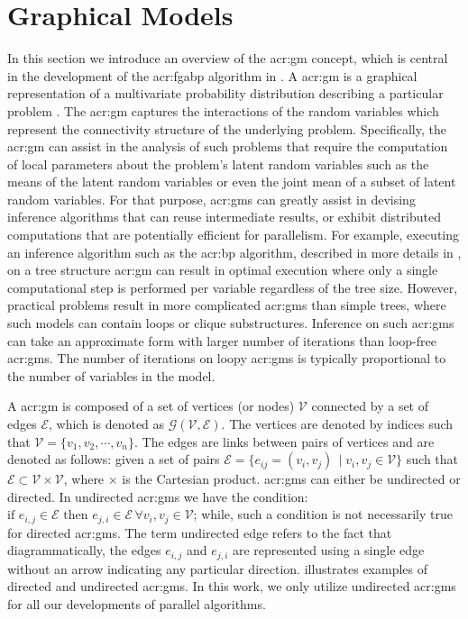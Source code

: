 \section{Graphical Models}


In this section we introduce an overview of the \gls{acr:gm} concept, which is central in the development of the \gls{acr:fgabp} algorithm in .
A \gls{acr:gm} is a graphical representation of a multivariate probability distribution describing a particular problem \cite{bib:PGMkoller2009}.
The \gls{acr:gm} captures the interactions of the random variables which represent the connectivity structure of the underlying problem.
Specifically, the \gls{acr:gm} can assist in the analysis of such problems that require the computation of local parameters about the problem's latent random variables such as the means of the latent random variables or even the joint mean of a subset of latent random variables.
For that purpose, \glspl{acr:gm} can greatly assist in devising inference algorithms that can reuse intermediate results, or exhibit distributed computations that are potentially efficient for parallelism.
For example, executing an inference algorithm such as the \gls{acr:bp} algorithm, described in more details in , on a tree structure \gls{acr:gm} can result in optimal execution where only a single computational step is performed per variable regardless of the tree size.
However, practical problems result in more complicated \glspl{acr:gm} than simple trees, where such models can contain loops or clique substructures.
Inference on such \glspl{acr:gm} can take an approximate form with larger number of iterations than loop-free \glspl{acr:gm}.
The number of iterations on loopy \glspl{acr:gm} is typically proportional to the number of variables in the model.  


A \gls{acr:gm} is composed of a set of vertices (or nodes) $\mathcal{V}$ connected by a set of edges $\mathcal{E}$, which is denoted as $\mathcal{G}(\mathcal{V},\mathcal{E})$.
The vertices are denoted by indices such that $\mathcal{V}=\{v_1,v_2,\cdots,v_n\}$.
The edges are links between pairs of vertices and are denoted as follows: given a set of pairs $\mathcal{E} = \{e_{ij} = (v_i,v_j)\, \mid v_i,v_j \in \mathcal{V}\}$ such that $\mathcal{E}\subset \mathcal{V} \times \mathcal{V}$, where $\times$ is the Cartesian product.
\glspl{acr:gm} can either be undirected or directed.
In undirected \glspl{acr:gm} we have the condition: $\text{if } e_{i,j} \in \mathcal{E} \text{ then } e_{j,i} \in \mathcal{E} \, \forall v_i,v_j \in \mathcal{V}$; while, such a condition is not necessarily true for directed \glspl{acr:gm}.
The term undirected edge refers to the fact that diagrammatically, the edges $e_{i,j}$ and $e_{j,i}$ are represented using a single edge without an arrow indicating any particular direction.
 illustrates examples of directed and undirected \glspl{acr:gm}.
In this work, we only utilize undirected \glspl{acr:gm} for all our developments of parallel algorithms.


